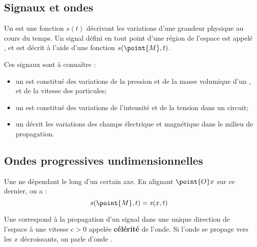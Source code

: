 \subsection{Signaux et ondes}

\begin{definition}
Un  est une fonction $s(t)$ décrivant les variations d'une grandeur physique au cours du temps. Un signal défini en tout point d'une région de l'espace est appelé , et est décrit à l'aide d'une fonction $s(\point{M}, t)$.
\end{definition}

\begin{vocabulaire}
Ces signaux sont à connaître :

\begin{itemize}
\item un  est constitué des variations de la pression et de la masse volumique d'un , et de la vitesse des particules;

\item un  est constitué des variations de l'intensité et de la tension dans un circuit;

\item un  décrit les variations des champs électrique et magnétique dans le milieu de propagation.
\end{itemize}
\end{vocabulaire}



\subsection{Ondes progressives undimensionnelles}

\begin{definition}
Une  ne dépendant  le long d'un certain axe. En alignant $\point{O}x$ sur ce dernier, on a :
\[s(\point{M}, t) = s(x, t)\]
\end{definition}

\begin{definition}
Une  correspond à la propagation d'un signal dans une unique direction de l'espace à une vitesse $c > 0$ appelée \textbf{célérité} de l'onde. Si l'onde se propage vers les $x$ décroissants, on parle d'onde .
\end{definition}


